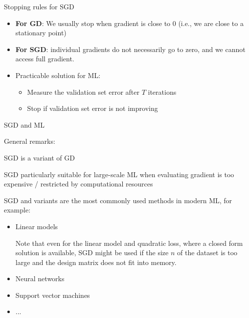 \documentclass[11pt,compress,t,notes=noshow, xcolor=table]{beamer}
\begin{document}
\begin{vbframe}{Stopping rules for SGD} 

\begin{itemize}
	\item \textbf{For GD}: We usually stop when gradient is close to $0$ (i.e., we are close to a stationary point)
	\item \textbf{For SGD}: individual gradients do not necessarily go to zero, and we cannot access full gradient.
	\item Practicable solution for ML: 
	\begin{itemize}
		\item Measure the validation set error after $T$ iterations
		\item Stop if validation set error is not improving
	\end{itemize}
\end{itemize}


\end{vbframe}


\begin{vbframe}{SGD and ML}

\begin{blocki}{General remarks:}
    \item SGD is a variant of GD 
    \item SGD particularly suitable for large-scale ML when evaluating gradient is too expensive / restricted by computational resources
    \item SGD and variants are the most commonly used methods in modern ML, for example:  
    \begin{itemize}
        \item Linear models \\
            \begin{footnotesize}
                Note that even for the linear model and quadratic loss, where a closed form solution is available, SGD might be used if the size $n$ of the dataset is too large and the design matrix does not fit into memory.
            \end{footnotesize}
        \item Neural networks 
        \item Support vector machines
        \item ...
    \end{itemize}
\end{blocki}

\end{vbframe}
\end{document}
